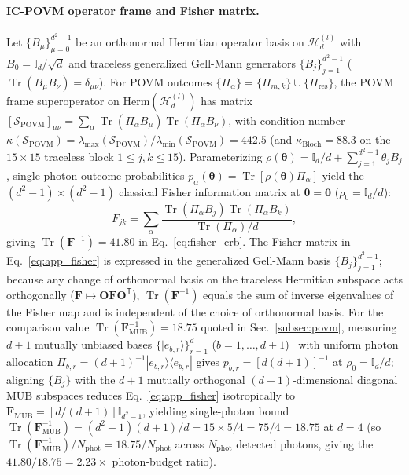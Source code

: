 \documentclass[aps,pra,onecolumn,notitlepage,11pt,tightenlines,nofootinbib,floatfix,longbibliography]{revtex4-2}
\newcommand{\ket}[1]{| #1 \rangle}
\newcommand{\bra}[1]{\langle #1 |}
\begin{document}
\paragraph*{IC-POVM operator frame and Fisher matrix.}
Let $\{B_\mu\}_{\mu=0}^{d^2-1}$ be an orthonormal Hermitian operator basis on $\mathcal{H}_d^{(l)}$ with $B_0 = \mathbb{I}_d/\sqrt{d}$ and traceless generalized Gell-Mann generators $\{B_j\}_{j=1}^{d^2-1}$ ($\operatorname{Tr}(B_\mu B_\nu) = \delta_{\mu\nu}$). For POVM outcomes $\{\Pi_\alpha\} = \{\Pi_{m,k}\} \cup \{\Pi_{\mathrm{res}}\}$, the POVM frame superoperator on $\mathrm{Herm}(\mathcal{H}_d^{(l)})$ has matrix $[\mathcal{S}_{\mathrm{POVM}}]_{\mu\nu} = \sum_\alpha \operatorname{Tr}(\Pi_\alpha B_\mu)\operatorname{Tr}(\Pi_\alpha B_\nu)$, with condition number $\kappa(\mathcal{S}_{\mathrm{POVM}}) = \lambda_{\max}(\mathcal{S}_{\mathrm{POVM}})/\lambda_{\min}(\mathcal{S}_{\mathrm{POVM}}) = 442.5$ (and $\kappa_{\mathrm{Bloch}} = 88.3$ on the $15\times 15$ traceless block $1 \le j,k \le 15$). Parameterizing $\rho(\boldsymbol{\theta}) = \mathbb{I}_d/d + \sum_{j=1}^{d^2-1}\theta_j B_j$, single-photon outcome probabilities $p_\alpha(\boldsymbol{\theta}) = \operatorname{Tr}[\rho(\boldsymbol{\theta})\Pi_\alpha]$ yield the $(d^2-1)\times(d^2-1)$ classical Fisher information matrix at $\boldsymbol{\theta} = \mathbf{0}$ ($\rho_0 = \mathbb{I}_d/d$):
\begin{equation}
F_{jk} = \sum_\alpha \frac{\operatorname{Tr}(\Pi_\alpha B_j)\operatorname{Tr}(\Pi_\alpha B_k)}{\operatorname{Tr}(\Pi_\alpha)/d},
\label{eq:app_fisher}
\end{equation}
giving $\operatorname{Tr}(\mathbf{F}^{-1}) = 41.80$ in Eq.~\eqref{eq:fisher_crb}. The Fisher matrix in Eq.~\eqref{eq:app_fisher} is expressed in the generalized Gell-Mann basis $\{B_j\}_{j=1}^{d^2-1}$; because any change of orthonormal basis on the traceless Hermitian subspace acts orthogonally ($\mathbf{F} \mapsto \mathbf{O}\mathbf{F}\mathbf{O}^{\mathsf{T}}$), $\operatorname{Tr}(\mathbf{F}^{-1})$ equals the sum of inverse eigenvalues of the Fisher map and is independent of the choice of orthonormal basis. For the comparison value $\operatorname{Tr}(\mathbf{F}_{\mathrm{MUB}}^{-1}) = 18.75$ quoted in Sec.~\ref{subsec:povm}, measuring $d + 1$ mutually unbiased bases $\{\ket{e_{b,r}}\}_{r=1}^d$ ($b = 1,\dots,d+1$)~\cite{WoottersFields1989} with uniform photon allocation $\Pi_{b,r} = (d+1)^{-1}\ket{e_{b,r}}\bra{e_{b,r}}$ gives $p_{b,r} = [d(d+1)]^{-1}$ at $\rho_0 = \mathbb{I}_d/d$; aligning $\{B_j\}$ with the $d+1$ mutually orthogonal $(d-1)$-dimensional diagonal MUB subspaces reduces Eq.~\eqref{eq:app_fisher} isotropically to $\mathbf{F}_{\mathrm{MUB}} = [d/(d+1)]\mathbb{I}_{d^2-1}$, yielding single-photon bound $\operatorname{Tr}(\mathbf{F}_{\mathrm{MUB}}^{-1}) = (d^2 - 1)(d + 1)/d = 15\times 5/4 = 75/4 = 18.75$ at $d = 4$ (so $\operatorname{Tr}(\mathbf{F}_{\mathrm{MUB}}^{-1})/N_{\mathrm{phot}} = 18.75/N_{\mathrm{phot}}$ across $N_{\mathrm{phot}}$ detected photons, giving the $41.80/18.75 = 2.23\times$ photon-budget ratio).
\end{document}
